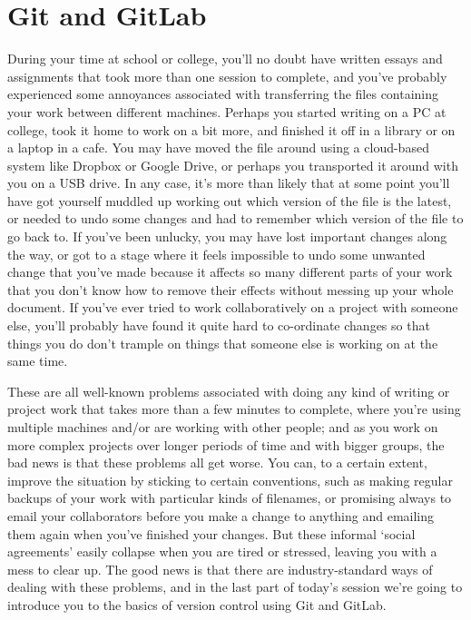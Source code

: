 
\section{Git and GitLab}

During your time at school or college, you'll no doubt have written essays and assignments that took more than one session to complete, and you've probably experienced some annoyances associated with transferring the files containing your work between different machines. Perhaps you started writing on a PC at college, took it home to work on a bit more, and finished it off in a library or on a laptop in a cafe. You may have moved the file around using a cloud-based system like Dropbox or Google Drive, or perhaps you transported it around with you on a USB drive. In any case, it's more than likely that at some point you'll have got yourself muddled up working out which version of the file is the latest, or needed to undo some changes and had to remember which version of the file to go back to. If you've been unlucky, you may have lost important changes along the way, or got to a stage where it feels impossible to undo some unwanted change that you've made because it affects so many different parts of your work that you don't know how to remove their effects without messing up your whole document. If you've ever tried to work collaboratively on a project with someone else, you'll probably have found it quite hard to co-ordinate changes so that things you do don't trample on things that someone else is working on at the same time. 

These are all well-known problems associated with doing any kind of writing or project work that takes more than a few minutes to complete, where you're using multiple machines and/or are working with other people; and as you work on more complex projects over longer periods of time and with bigger groups, the bad news is that these problems all get worse. You can, to a certain extent, improve the situation by sticking to certain conventions, such as making regular backups of your work with particular kinds of filenames, or promising always to email your collaborators before you make a change to anything and emailing them again when you've finished your changes. But these informal `social agreements' easily collapse when you are tired or stressed, leaving you with a mess to clear up. The good news is that there are industry-standard ways of dealing with these problems, and in the last part of today's session we're going to introduce you to the basics of version control using Git and GitLab. 

